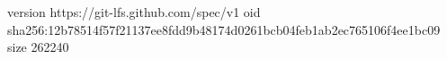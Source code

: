 version https://git-lfs.github.com/spec/v1
oid sha256:12b78514f57f21137ee8fdd9b48174d0261bcb04feb1ab2ec765106f4ee1bc09
size 262240
